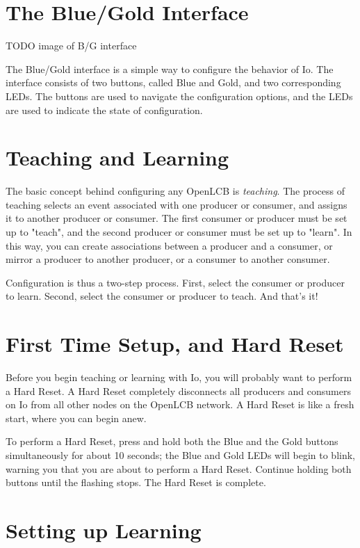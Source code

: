 \documentclass[12pt]{book}
\begin{document}
\section{The Blue/Gold Interface}

TODO image of B/G interface

The Blue/Gold interface is a simple way to configure the behavior of Io. The interface consists of two buttons, called Blue and Gold, and two corresponding LEDs. The buttons are used to navigate the configuration options, and the LEDs are used to indicate the state of configuration.

\section{Teaching and Learning}

The basic concept behind configuring any OpenLCB is \textit{teaching}. The process of teaching selects an event associated with one producer or consumer, and assigns it to another producer or consumer. The first consumer or producer must be set up to  "teach", and the second producer or consumer must be set up to "learn". In this way, you can create associations between a producer and a consumer, or mirror a producer to another producer, or a consumer to another consumer.

Configuration is thus a two-step process. First, select the consumer or producer to learn. Second, select the consumer or producer to teach. And that's it!

\section{First Time Setup, and Hard Reset}

Before you begin teaching or learning with Io, you will probably want to perform a Hard Reset. A Hard Reset completely disconnects all producers and consumers on Io from all other nodes on the OpenLCB network. A Hard Reset is like a fresh start, where you can begin anew.

To perform a Hard Reset, press and hold both the Blue and the Gold buttons simultaneously for about 10 seconds; the Blue and Gold LEDs will begin to blink, warning you that you are about to perform a Hard Reset. Continue holding both buttons until the flashing stops. The Hard Reset is complete.

\section{Setting up Learning}
\end{document}
